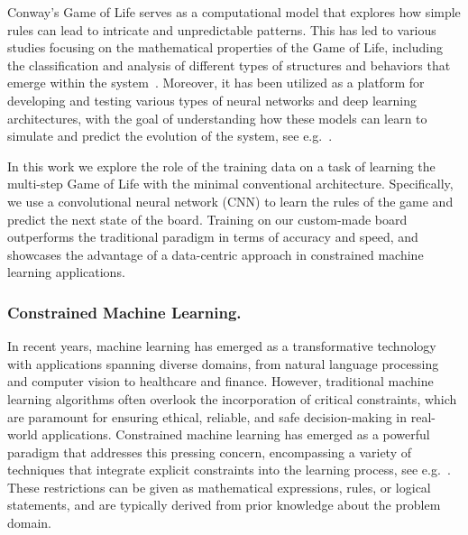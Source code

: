 \documentclass[letterpaper]{article} %
\begin{document}
Conway's Game of Life serves as a computational model that explores how simple rules can lead to intricate and unpredictable patterns. 
This has led to various studies focusing on the mathematical properties of the Game of Life, including the classification and analysis of different types of structures and behaviors that emerge within the system~\cite{adamatzky2010game, hirte2022john}.
Moreover, it has been utilized as a platform for developing and testing various types of neural networks and deep learning architectures, with the goal of understanding how these models can learn to simulate and predict the evolution of the system, see e.g.~\cite{krechetov2021game, grattarola2021learning}.


In this work we explore the role of the training data on a task of learning the multi-step Game of Life with the minimal conventional architecture.
Specifically, we use a convolutional neural network (CNN) to learn the rules of the game and predict the next state of the board.
Training on our custom-made board outperforms the traditional paradigm in terms of accuracy and speed, and showcases the advantage of a data-centric approach in constrained machine learning applications.


\subsubsection{Constrained Machine Learning.}
In recent years, machine learning has emerged as a transformative technology with applications spanning diverse domains, from natural language processing and computer vision to healthcare and finance.
However, traditional machine learning algorithms often overlook the incorporation of critical constraints, which are paramount for ensuring ethical, reliable, and safe decision-making in real-world applications.
Constrained machine learning has emerged as a powerful paradigm that addresses this pressing concern, encompassing a variety of techniques that integrate explicit constraints into the learning process, see e.g.~\cite{perez2021constrained, yao2021power, gori2023machine}.
These restrictions can be given as mathematical expressions, rules, or logical statements, and are typically derived from prior knowledge about the problem domain.
\end{document}
